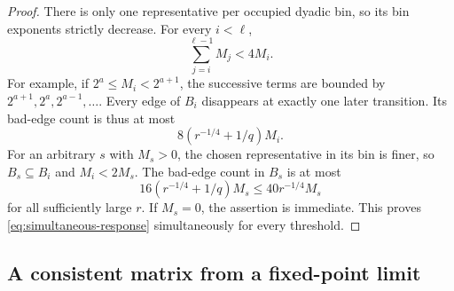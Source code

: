 \begin{proof}
There is only one representative per occupied dyadic bin, so its
bin exponents strictly decrease. For every \(i<\ell\),
\begin{equation}\label{eq:dyadic-tail}
 \sum_{j=i}^{\ell-1}M_j<4M_i.
\end{equation}
For example, if \(2^a\le M_i<2^{a+1}\), the successive terms are
bounded by \(2^{a+1},2^a,2^{a-1},\ldots\).
Every edge of \(B_i\) disappears at exactly one later transition.
Its bad-edge count is thus at most
\[
 8(r^{-1/4}+1/q)M_i.
\]
For an arbitrary \(s\) with \(M_s>0\), the chosen representative
in its bin is finer, so \(B_s\subseteq B_i\) and \(M_i<2M_s\).
The bad-edge count in \(B_s\) is at most
\[
 16(r^{-1/4}+1/q)M_s\le40r^{-1/4}M_s
\]
for all sufficiently large \(r\). If \(M_s=0\), the assertion is
immediate. This proves \eqref{eq:simultaneous-response}
simultaneously for every threshold.
\end{proof}



\subsection{A consistent matrix from a fixed-point limit}

